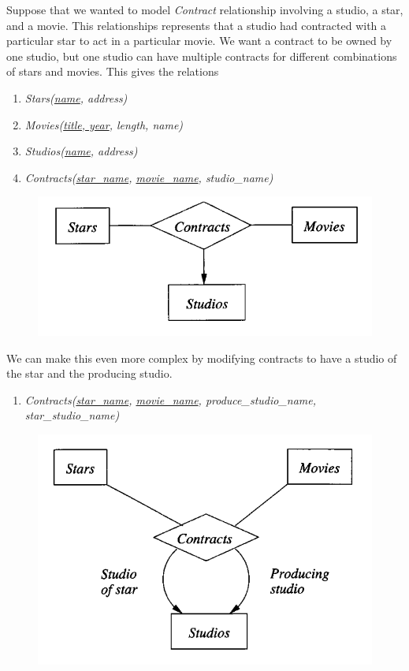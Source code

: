 \documentclass{article}
\begin{document}
      \begin{example}
        Suppose that we wanted to model \textit{Contract} relationship involving a studio, a star, and a movie. This relationships represents that a studio had contracted with a particular star to act in a particular movie. We want a contract to be owned by one studio, but one studio can have multiple contracts for different combinations of stars and movies. This gives the relations 
        \begin{enumerate}
          \item \textit{Stars(\underline{name}, address)} 
          \item \textit{Movies(\underline{title, year}, length, name)} 
          \item \textit{Studios(\underline{name}, address)} 
          \item \textit{Contracts(\underline{star\_name}, \underline{movie\_name}, studio\_name)}
        \end{enumerate}
        \begin{figure}[H]
          \centering 
          \includegraphics[scale=0.4]{img/contracts.png}
          \caption{} 
          \label{fig:contracts}
        \end{figure}
        We can make this even more complex by modifying contracts to have a studio of the star and the producing studio. 
        \begin{enumerate}
          \item \textit{Contracts(\underline{star\_name}, \underline{movie\_name}, produce\_studio\_name, star\_studio\_name)}
        \end{enumerate}
        \begin{figure}[H]
          \centering 
          \includegraphics[scale=0.4]{img/four_ary.png}

\end{figure}
\end{example}
\end{document}

